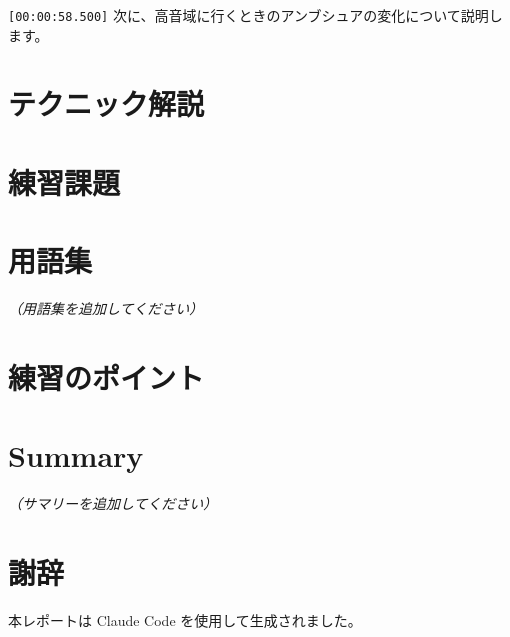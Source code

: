\documentclass[a4paper,10pt,twocolumn]{ltjsarticle}
\begin{document}
\texttt{[00:00:58.500]} 次に、高音域に行くときのアンブシュアの変化について説明します。


\section{テクニック解説}



\section{練習課題}



\section{用語集}

\textit{（用語集を追加してください）}

\section{練習のポイント}



\section{Summary}

\textit{（サマリーを追加してください）}

\section*{謝辞}

本レポートは Claude Code を使用して生成されました。
\end{document}
